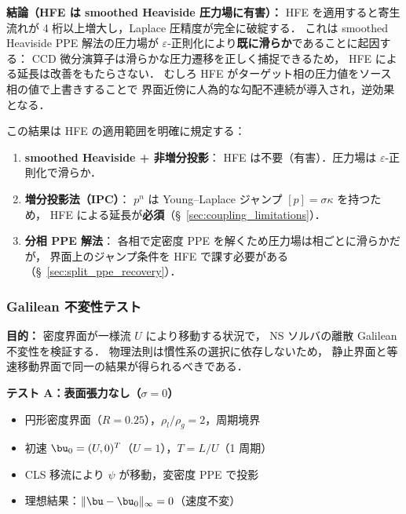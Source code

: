 \noindent\textbf{結論（HFE は smoothed Heaviside 圧力場に有害）：}
HFE を適用すると寄生流れが 4 桁以上増大し，Laplace 圧精度が完全に破綻する．
これは smoothed Heaviside PPE 解法の圧力場が
$\varepsilon$-正則化により\textbf{既に滑らか}であることに起因する：
CCD 微分演算子は滑らかな圧力遷移を正しく捕捉できるため，
HFE による延長は改善をもたらさない．
むしろ HFE がターゲット相の圧力値をソース相の値で上書きすることで
界面近傍に人為的な勾配不連続が導入され，逆効果となる．

\noindent
この結果は HFE の適用範囲を明確に規定する：
\begin{enumerate}[noitemsep]
  \item \textbf{smoothed Heaviside + 非増分投影}：
        HFE は不要（有害）．圧力場は $\varepsilon$-正則化で滑らか．
  \item \textbf{増分投影法（IPC）}：
        $p^n$ は Young--Laplace ジャンプ $[p] = \sigma\kappa$ を持つため，
        HFE による延長が\textbf{必須}（§~\ref{sec:coupling_limitations}）．
  \item \textbf{分相 PPE 解法}：
        各相で定密度 PPE を解くため圧力場は相ごとに滑らかだが，
        界面上のジャンプ条件を HFE で課す必要がある
        （§~\ref{sec:split_ppe_recovery}）．
\end{enumerate}

\subsubsection{Galilean 不変性テスト}
\label{sec:galilean_invariance}

\noindent\textbf{目的：}
密度界面が一様流 $U$ により移動する状況で，
NS ソルバの離散 Galilean 不変性を検証する．
物理法則は慣性系の選択に依存しないため，
静止界面と等速移動界面で同一の結果が得られるべきである．

\noindent\textbf{テスト A：表面張力なし（$\sigma = 0$）}
\begin{itemize}[noitemsep]
  \item 円形密度界面（$R = 0.25$），$\rho_l/\rho_g = 2$，周期境界
  \item 初速 $\bu_0 = (U, 0)^T$（$U = 1$），$T = L/U$（1 周期）
  \item CLS 移流により $\psi$ が移動，変密度 PPE で投影
  \item 理想結果：$\|\bu - \bu_0\|_\infty = 0$（速度不変）
\end{itemize}

